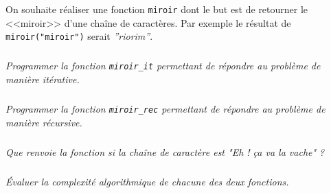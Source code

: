 On souhaite réaliser une fonction \texttt{miroir} dont le but est de retourner le <<miroir>> d'une chaîne de caractères. 
Par exemple le résultat de \texttt{miroir("miroir")} serait \textsl{''riorim''}.

\subparagraph{}
\textit{Programmer la fonction \texttt{miroir\_it} permettant de répondre au problème de manière itérative.}

\subparagraph{}
\textit{Programmer la fonction \texttt{miroir\_rec} permettant de répondre au problème de manière récursive.}

\subparagraph{}
\textit{Que renvoie la fonction si la chaîne de caractère est "Eh ! ça va la vache" ?}
 
 \subparagraph{}
\textit{Évaluer la complexité algorithmique de chacune des deux fonctions.}
\fi


\ifprof
